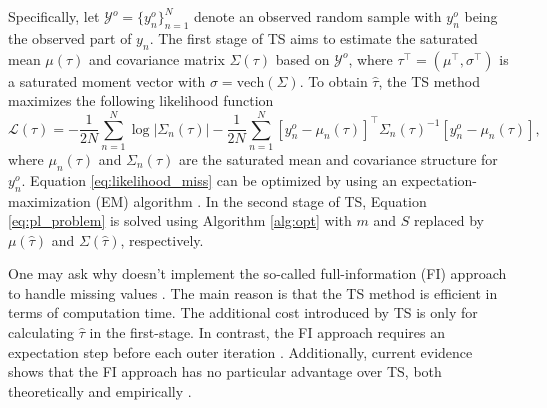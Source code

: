 \documentclass[nojss]{jss}
\begin{document}
Specifically, let $\mathcal{Y}^o = \{ y_n^o \}_{n=1}^N$ denote an observed random sample with $y_n^o$ being the observed part of $y_n$. The first stage of TS aims to estimate the saturated mean $\mu(\tau)$ and covariance matrix $\Sigma(\tau)$ based on $\mathcal{Y}^o$, where $\tau^\top=(\mu^\top, \sigma^\top)$ is a saturated moment vector with $\sigma = \text{vech}(\Sigma)$. To obtain $\hat{\tau}$, the TS method maximizes the following likelihood function
%
\begin{equation} \label{eq:likelihood_miss}
\mathcal{L}(\tau) = -\frac{1}{2N} \sum_{n=1}^N \log{ \big| \Sigma_n(\tau) \big|} -
\frac{1}{2N} \sum_{n=1}^N [y_n^o - \mu_n(\tau)]^\top \Sigma_n(\tau)^{-1} [y_n^o - \mu_n(\tau)],
\end{equation}
%
where $\mu_n(\tau)$ and $\Sigma_n(\tau)$ are the saturated mean and covariance structure for $y_n^o$. Equation \ref{eq:likelihood_miss} can be optimized by using an expectation-maximization (EM) algorithm \citep{Dempster1977}. In the second stage of TS, Equation \ref{eq:pl_problem} is solved using Algorithm \ref{alg:opt} with $m$ and $S$ replaced by $\mu(\hat{\tau})$ and $\Sigma(\hat{\tau})$, respectively.

One may ask why  doesn't implement the so-called full-information (FI) approach to handle missing values \citep{Enders2001d}. The main reason is that the TS method is efficient in terms of computation time. The additional cost introduced by TS is only for calculating $\hat{\tau}$ in the first-stage. In contrast, the FI approach requires an expectation step before each outer iteration \citep{Jamshidian1999}. Additionally, current evidence shows that the FI approach has no particular advantage over TS, both theoretically \citep{Yuan2000} and empirically \citep{Savalei2009, Savalei2014}. 
\end{document}
